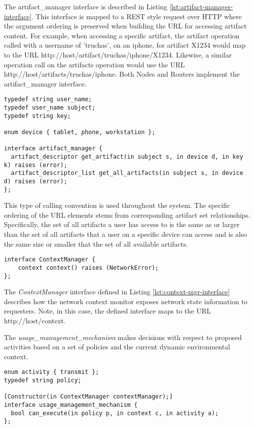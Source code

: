 The artifact\_manager interface is described in Listing \ref{lst:artifact-manager-interface}.  This interface is mapped to a REST style request over HTTP where the argument ordering is preserved when building the URL for accessing artifact content.  For example, when accessing a specific artifact, the artifact operation called with a username of 'truchas', on an iphone, for artifact X1234 would map to the URL http://host/artifact/truchas/iphone/X1234.  Likewise, a similar operation call on the artifacts operation would use the URL http://host/artifacts/truchas/iphone.  Both Nodes and Routers implement the artifact\_manager interface.

\begin{lstlisting}[language=idl, label=lst:artifact-manager-interface, caption=The Node Interface]
typedef string user_name;
typedef user_name subject;
typedef string key;

enum device { tablet, phone, workstation };

interface artifact_manager {
  artifact_descriptor get_artifact(in subject s, in device d, in key k) raises (error);
  artifact_descriptor_list get_all_artifacts(in subject s, in device d) raises (error);
};
\end{lstlisting}

This type of calling convention is used throughout the system.  The specific ordering of the URL elements stems from corresponding artifact set relationships.  Specifically, the set of all artifacts a user has access to is the same as or larger than the set of all artifacts that a user on a specific device can access and is also the same size or smaller that the set of all available artifacts.

\begin{lstlisting}[language=idl, label=lst:context-mgr-interface, caption=The Context Manager Interface]
interface ContextManager {
	context context() raises (NetworkError);
};
\end{lstlisting}

The \emph{ContextManager} interface defined in Listing \ref{lst:context-mgr-interface} describes how the network context monitor exposes network state information to requesters.  Note, in this case, the defined interface maps to the URL http://host/context.

The \emph{usage\_management\_mechanism} makes decisions with respect to proposed activities based on a set of policies and the current dynamic environmental context.

\begin{lstlisting}[language=idl, label=lst:umm-interface, caption=The Usage Management Mechanism Interface]
enum activity { transmit };
typedef string policy;

[Constructor(in ContextManager contextManager);]
interface usage_management_mechanism {
  bool can_execute(in policy p, in context c, in activity a);
};
\end{lstlisting}

